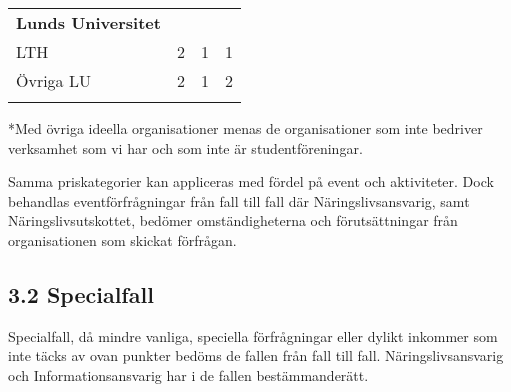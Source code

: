 \documentclass{dsekkallelse}
\begin{document}
\begin{table}[]
\begin{tabular}{@{}lccc@{}}
        \addlinespace
        \midrule
        \addlinespace
        \textbf{Lunds Universitet}         &                               &                                                                                               &                                                                                   \\
        \addlinespace
        \cmidrule{1-1}
        LTH                                & 2                             & 1                                                                                             & 1                                                                                 \\
        Övriga LU                          & 2                             & 1                                                                                             & 2                                                                                 \\
        \addlinespace
        \bottomrule
    \end{tabular}
\end{table}



*Med övriga ideella organisationer menas de organisationer som inte bedriver verksamhet  som vi har och som inte är studentföreningar.

Samma priskategorier kan appliceras med fördel på event och aktiviteter. Dock behandlas eventförfrågningar från fall till fall där Näringslivsansvarig, samt Näringslivsutskottet, bedömer omständigheterna och förutsättningar från organisationen som  skickat förfrågan.

\subsection{3.2 Specialfall}
Specialfall, då mindre vanliga, speciella förfrågningar eller dylikt inkommer som inte täcks av  ovan punkter bedöms de fallen från fall till fall. Näringslivsansvarig och Informationsansvarig har i de fallen bestämmanderätt.
\end{document}
